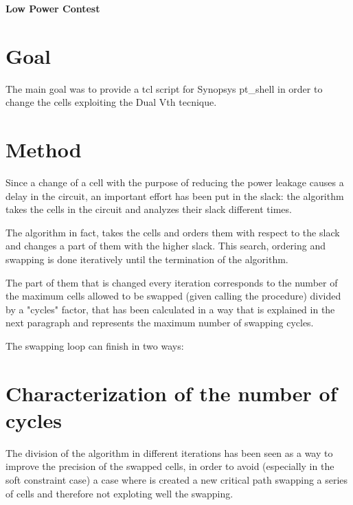 \documentclass[10pt, english, oneside]{article}
\begin{document}
\begin{center}
  \huge \textbf{Low Power Contest}
\end{center}

\justify

\section{Goal} \label{sec:goal}
The main goal was to provide a tcl script for Synopsys pt_shell in order to
change the cells exploiting the Dual Vth tecnique.
\section{Method} \label{sec:method}
Since a change of a cell with the purpose of reducing the power leakage causes a
delay in the circuit, an important effort has been put in the slack: the
algorithm takes the cells in the circuit and analyzes their slack different times.

The algorithm in fact, takes the cells and orders them with respect to the slack
and changes a part of them with the higher slack.
This search, ordering and swapping is done iteratively until the termination of
the algorithm.

The part of them that is changed every iteration corresponds to the number of
the maximum cells allowed to be swapped (given calling the procedure) divided by
a "cycles" factor, that has been calculated in a way that is explained in the
next paragraph and represents the maximum number of swapping cycles.

The swapping loop can finish in two ways:
\section{Characterization of the number of cycles} \label{sec:characterization}
The division of the algorithm in different iterations has been seen as a way to
improve the precision of the swapped cells, in order to avoid (especially in the
soft constraint case) a case where is created a new critical path swapping a
series of cells and therefore not exploting well the swapping.
\end{document}
